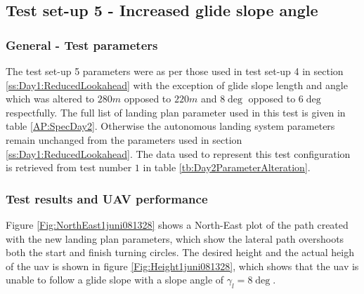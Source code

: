 \subsection{Test set-up 5 - Increased glide slope angle}\label{ss:Day2GlideSlope}
\subsubsection{General - Test parameters}
The test set-up 5 parameters were as per those used in test set-up 4 in section \ref{ss:Day1:ReducedLookahead} with the exception of glide slope length and angle which was altered to $280 m$ opposed to $220 m$ and $8 \deg$ opposed to $6 \deg$ respectfully. The full list of landing plan parameter used in this test is given in table \ref{AP:SpecDay2}. Otherwise the autonomous landing system parameters remain unchanged from the parameters used in section \ref{ss:Day1:ReducedLookahead}. The data used to represent this test configuration is retrieved from test number $1$ in table \ref{tb:Day2ParameterAlteration}.
\subsubsection{Test results and UAV performance}
Figure \ref{Fig:NorthEast1juni081328} shows a North-East plot of the path created with the new landing plan parameters, which show the lateral path overshoots both the start and finish turning circles. The desired height and the actual heigh of the \gls{uav} is shown in figure \ref{Fig:Height1juni081328}, which shows that the \gls{uav} is unable to follow a glide slope with a slope angle of $\gamma_l = 8 \deg$. 

